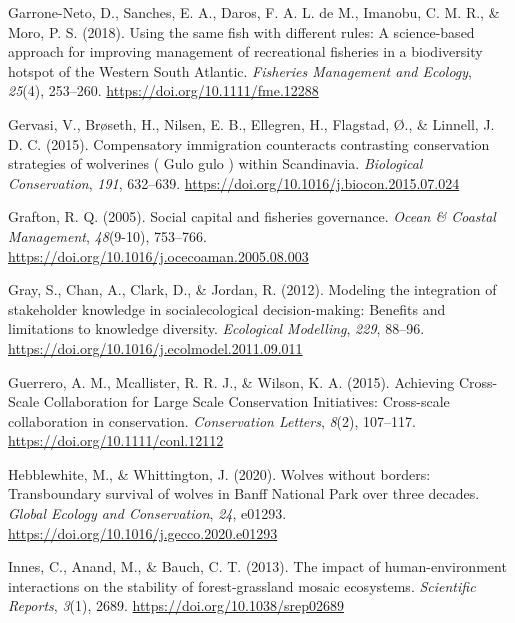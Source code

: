 \documentclass[
  12pt,
]{article}
\newlength{\cslhangindent}
\newlength{\cslentryspacingunit} %
\newenvironment{CSLReferences}[2] %
 {%
  \setlength{\parindent}{0pt}
  \ifodd #1
  \let\oldpar\par
  \def\par{\hangindent=\cslhangindent\oldpar}
  \fi
  \setlength{\parskip}{#2\cslentryspacingunit}
 }%
 {}
\begin{document}
\begin{CSLReferences}{1}{2}
\leavevmode{}%
Garrone-Neto, D., Sanches, E. A., Daros, F. A. L. de M., Imanobu, C. M. R., \& Moro, P. S. (2018). Using the same fish with different rules: {A} science-based approach for improving management of recreational fisheries in a biodiversity hotspot of the {Western South Atlantic}. \emph{Fisheries Management and Ecology}, \emph{25}(4), 253--260. \url{https://doi.org/10.1111/fme.12288}

\leavevmode{}%
Gervasi, V., Brøseth, H., Nilsen, E. B., Ellegren, H., Flagstad, Ø., \& Linnell, J. D. C. (2015). Compensatory immigration counteracts contrasting conservation strategies of wolverines ( {Gulo} gulo ) within {Scandinavia}. \emph{Biological Conservation}, \emph{191}, 632--639. \url{https://doi.org/10.1016/j.biocon.2015.07.024}

\leavevmode{}%
Grafton, R. Q. (2005). Social capital and fisheries governance. \emph{Ocean \& Coastal Management}, \emph{48}(9-10), 753--766. \url{https://doi.org/10.1016/j.ocecoaman.2005.08.003}

\leavevmode{}%
Gray, S., Chan, A., Clark, D., \& Jordan, R. (2012). Modeling the integration of stakeholder knowledge in social{\textendash}ecological decision-making: {Benefits} and limitations to knowledge diversity. \emph{Ecological Modelling}, \emph{229}, 88--96. \url{https://doi.org/10.1016/j.ecolmodel.2011.09.011}

\leavevmode{}%
Guerrero, A. M., Mcallister, R. R. J., \& Wilson, K. A. (2015). Achieving {Cross-Scale Collaboration} for {Large Scale Conservation Initiatives}: {Cross-scale} collaboration in conservation. \emph{Conservation Letters}, \emph{8}(2), 107--117. \url{https://doi.org/10.1111/conl.12112}

\leavevmode{}%
Hebblewhite, M., \& Whittington, J. (2020). Wolves without borders: {Transboundary} survival of wolves in {Banff National Park} over three decades. \emph{Global Ecology and Conservation}, \emph{24}, e01293. \url{https://doi.org/10.1016/j.gecco.2020.e01293}

\leavevmode{}%
Innes, C., Anand, M., \& Bauch, C. T. (2013). The impact of human-environment interactions on the stability of forest-grassland mosaic ecosystems. \emph{Scientific Reports}, \emph{3}(1), 2689. \url{https://doi.org/10.1038/srep02689}


\end{CSLReferences}
\end{document}
